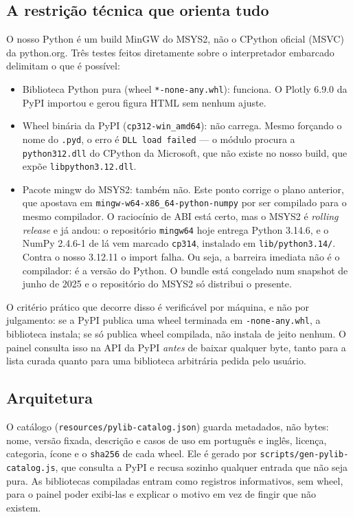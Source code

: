 \documentclass[11pt,a4paper]{article}
\begin{document}
\subsection{A restrição técnica que orienta tudo}

O nosso Python é um build MinGW do MSYS2, não o CPython oficial (MSVC) da
python.org. Três testes feitos diretamente sobre o interpretador embarcado
delimitam o que é possível:

\begin{itemize}
  \item Biblioteca Python pura (wheel \texttt{*-none-any.whl}): funciona. O
        Plotly 6.9.0 da PyPI importou e gerou figura HTML sem nenhum ajuste.
  \item Wheel binária da PyPI (\texttt{cp312-win\_amd64}): não carrega. Mesmo
        forçando o nome do \texttt{.pyd}, o erro é \texttt{DLL load failed} —
        o módulo procura a \texttt{python312.dll} do CPython da Microsoft, que
        não existe no nosso build, que expõe \texttt{libpython3.12.dll}.
  \item Pacote mingw do MSYS2: também não. Este ponto corrige o plano anterior,
        que apostava em \texttt{mingw-w64-x86\_64-python-numpy} por ser compilado
        para o mesmo compilador. O raciocínio de ABI está certo, mas o MSYS2 é
        \emph{rolling release} e já andou: o repositório \texttt{mingw64} hoje
        entrega Python 3.14.6, e o NumPy 2.4.6-1 de lá vem marcado \texttt{cp314},
        instalado em \texttt{lib/python3.14/}. Contra o nosso 3.12.11 o import
        falha. Ou seja, a barreira imediata não é o compilador: é a versão do
        Python. O bundle está congelado num snapshot de junho de 2025 e o
        repositório do MSYS2 só distribui o presente.
\end{itemize}

O critério prático que decorre disso é verificável por máquina, e não por
julgamento: se a PyPI publica uma wheel terminada em \texttt{-none-any.whl}, a
biblioteca instala; se só publica wheel compilada, não instala de jeito nenhum.
O painel consulta isso na API da PyPI \emph{antes} de baixar qualquer byte, tanto
para a lista curada quanto para uma biblioteca arbitrária pedida pelo usuário.

\subsection{Arquitetura}

O catálogo (\texttt{resources/pylib-catalog.json}) guarda metadados, não bytes:
nome, versão fixada, descrição e casos de uso em português e inglês, licença,
categoria, ícone e o \texttt{sha256} de cada wheel. Ele é gerado por
\texttt{scripts/gen-pylib-catalog.js}, que consulta a PyPI e recusa sozinho
qualquer entrada que não seja pura. As bibliotecas compiladas entram como
registros informativos, sem wheel, para o painel poder exibi-las e explicar o
motivo em vez de fingir que não existem.
\end{document}
